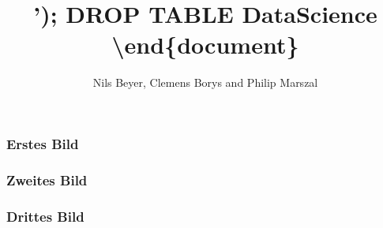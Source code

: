 \documentclass{beamer}
\begin{document}
\title{'); DROP TABLE DataScience \textbackslash end\{document\}}
\author{Nils Beyer, Clemens Borys and Philip Marszal}
\begin{frame}
\titlepage
\end{frame}

\begin{frame}\frametitle{Erstes Bild}

\end{frame}

\begin{frame}\frametitle{Zweites Bild}

\end{frame}

\begin{frame}\frametitle{Drittes Bild}

\end{frame}
\end{document}
